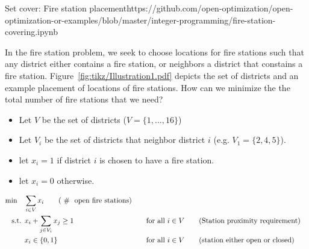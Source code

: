 \begin{examplewithcode}{Set cover: Fire station placement}{https://github.com/open-optimization/open-optimization-or-examples/blob/master/integer-programming/fire-station-covering.ipynb}
\label{example:fire-station}

In the fire station problem, we seek to choose locations for fire stations such that any district either contains a fire station, or neighbors a district that constains a fire station.  Figure~\ref{fig:tikz/Illustration1.pdf} depicts the set of districts and an example placement of locations of fire stations.  How can we minimize the the total number of fire stations that we need?

\begin{itemize}
\item Let $V$ be the set of districts ($V = \{1, \dots, 16\}$)
\item Let $V_i$ be the set of districts that neighbor district $i$ (e.g. $V_1 = \{2,4,5\}$).
\end{itemize}

\begin{itemize}
\item let $x_i = 1$ if district $i$ is chosen to have a fire station.
\item let $x_i = 0$ otherwise.
\end{itemize}
\begin{align}
\min \quad & \sum_{i \in V} x_i \tag{ \# \text{ open fire stations}} \\
\st        & x_i + \sum_{j \in V_i} x_j \geq 1 &&\quad \text{for all } {i \in V}   \tag{Station proximity requirement} \\
& x_i \in \{0,1\} &&\quad \text{for all } i\in V   \tag{station either open or closed}
\end{align}
\end{examplewithcode}




